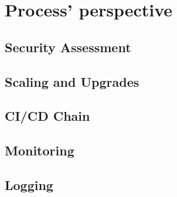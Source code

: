 \section{Process' perspective}
\subsection{Security Assessment}


\subsection{Scaling and Upgrades}


\subsection{CI/CD Chain}


\subsection{Monitoring}


\subsection{Logging}
